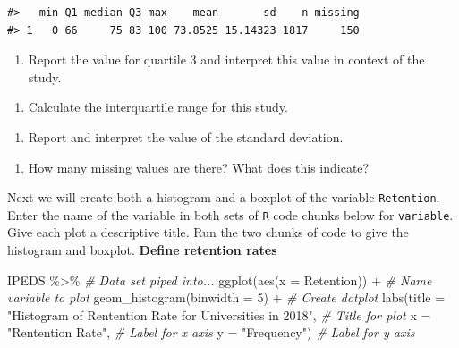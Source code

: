 \documentclass[
]{report}
\newenvironment{Shaded}{\begin{snugshade}}{\end{snugshade}}
\newcommand{\AttributeTok}[1]{\textcolor[rgb]{0.77,0.63,0.00}{#1}}
\newcommand{\CommentTok}[1]{\textcolor[rgb]{0.56,0.35,0.01}{\textit{#1}}}
\newcommand{\DecValTok}[1]{\textcolor[rgb]{0.00,0.00,0.81}{#1}}
\newcommand{\FunctionTok}[1]{\textcolor[rgb]{0.00,0.00,0.00}{#1}}
\newcommand{\NormalTok}[1]{#1}
\newcommand{\SpecialCharTok}[1]{\textcolor[rgb]{0.00,0.00,0.00}{#1}}
\newcommand{\StringTok}[1]{\textcolor[rgb]{0.31,0.60,0.02}{#1}}
\providecommand{\tightlist}{%
  \setlength{\itemsep}{0pt}\setlength{\parskip}{0pt}}
\begin{document}
\begin{verbatim}
#>   min Q1 median Q3 max    mean       sd    n missing
#> 1   0 66     75 83 100 73.8525 15.14323 1817     150
\end{verbatim}

\begin{enumerate}
\def\labelenumi{\arabic{enumi}.}
\setcounter{enumi}{4}
\tightlist
\item
  Report the value for quartile 3 and interpret this value in context of the study.
\end{enumerate}

\vspace{1in}

\begin{enumerate}
\def\labelenumi{\arabic{enumi}.}
\setcounter{enumi}{5}
\tightlist
\item
  Calculate the interquartile range for this study.
\end{enumerate}

\vspace{0.5in}

\begin{enumerate}
\def\labelenumi{\arabic{enumi}.}
\setcounter{enumi}{6}
\tightlist
\item
  Report and interpret the value of the standard deviation.
\end{enumerate}

\vspace{1in}

\begin{enumerate}
\def\labelenumi{\arabic{enumi}.}
\setcounter{enumi}{7}
\tightlist
\item
  How many missing values are there? What does this indicate?
\end{enumerate}

\vspace{0.8in}

Next we will create both a histogram and a boxplot of the variable \texttt{Retention}. Enter the name of the variable in both sets of \texttt{R} code chunks below for \texttt{variable}. Give each plot a descriptive title. Run the two chunks of code to give the histogram and boxplot. \textbf{Define retention rates}

\begin{Shaded}
\begin{Highlighting}[]
\NormalTok{IPEDS }\SpecialCharTok{\%\textgreater{}\%} \CommentTok{\# Data set piped into...}
\FunctionTok{ggplot}\NormalTok{(}\FunctionTok{aes}\NormalTok{(}\AttributeTok{x =}\NormalTok{ Retention)) }\SpecialCharTok{+}   \CommentTok{\# Name variable to plot}
  \FunctionTok{geom\_histogram}\NormalTok{(}\AttributeTok{binwidth =} \DecValTok{5}\NormalTok{) }\SpecialCharTok{+}  \CommentTok{\# Create dotplot}
  \FunctionTok{labs}\NormalTok{(}\AttributeTok{title =} \StringTok{"Histogram of Rentention Rate for Universities in 2018"}\NormalTok{, }\CommentTok{\# Title for plot}
       \AttributeTok{x =} \StringTok{"Rentention Rate"}\NormalTok{, }\CommentTok{\# Label for x axis}
       \AttributeTok{y =} \StringTok{"Frequency"}\NormalTok{) }\CommentTok{\# Label for y axis}
\end{Highlighting}
\end{Shaded}
\end{document}
